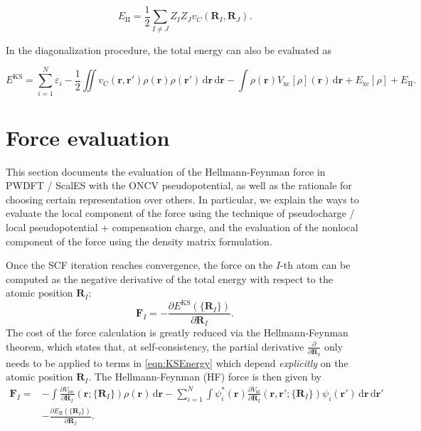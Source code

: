 \documentclass{article}
\newcommand{\bvec}[1]{\mathbf{#1}}
\newcommand{\vr}{\bvec{r}}
\newcommand{\vF}{\bvec{F}}
\newcommand{\vR}{\bvec{R}}
\newcommand{\ud}{\,\mathrm{d}}
\newcommand{\II}{\mathrm{II}}
\newcommand{\xc}{\mathrm{xc}}
\theoremstyle{plain}
\theoremstyle{remark}
\theoremstyle{plain}
\theoremstyle{plain}
\theoremstyle{plain}
\begin{document}
\begin{equation}
E_{\II}=\frac12 \sum_{I\ne J} Z_I Z_J v_C(\vR_I,\vR_J).
\label{eqn:ionionenergy}
\end{equation}

In the diagonalization procedure, the total energy can also be evaluated as

\begin{equation}
  E^{\text{KS}}=\sum_{i=1}^N \varepsilon_i - \frac{1}{2} \iint v_C(\vr,\vr')\rho(\vr) \rho(\vr') \ud \vr \ud \vr-\int
    \rho(\vr)V_{\xc}[\rho](\vr) \ud \vr+E_{\xc}[\rho] + E_{\II}.
  \label{eqn:KSEnergy2}
\end{equation}

 
\section{Force evaluation}\label{sec:force}

This section documents the evaluation of the Hellmann-Feynman force in PWDFT / ScalES with the ONCV pseudopotential, as well as the rationale for choosing certain representation over others. In particular, we explain the ways to evaluate the local component of the force using the technique of pseudocharge / local pseudopotential + compensation charge, and the evaluation of the nonlocal component of the force using the density matrix formulation.

Once the SCF iteration
reaches convergence, the force on the $I$-th atom can be
computed as the negative derivative of the total energy with respect to
the atomic position $\vR_{I}$:
\begin{equation}
  \vF_{I} = -\frac{\partial E^{\text{KS}}(\{\vR_{I}\})}{\partial
  \vR_{I}}.
  \label{eqn:forceDef}
\end{equation}
The cost of the force calculation is
greatly reduced via the Hellmann-Feynman theorem,
which states that, at self-consistency,
the partial derivative $\frac{\partial}{\partial \vR_{I}}$ only needs to be applied to
terms in \cref{eqn:KSEnergy} which depend \textit{explicitly} on the
atomic position $\vR_{I}$. The Hellmann-Feynman (HF) force is then given by
\begin{equation}
  \begin{split}
    \vF_{I} = &-\int \frac{\partial
    V_{\text{loc}}}{\partial \vR_{I}}(\vr;\{\vR_{I}\}) \rho(\vr) \ud \vr
    - \sum_{i=1}^{N} \int \psi_{i}^{*}(\vr)
    \frac{\partial V_{\text{nl}}}{\partial \vR_{I}}(\vr,\vr';\{\vR_{I}\})
    \psi_{i}(\vr') \ud \vr \ud \vr'\\
    &-\frac{\partial E_{\II}(\{\vR_{I}\})}{\partial
  \vR_{I}}.
  \end{split}
  \label{eqn:forceHF1}
\end{equation}
\end{document}

